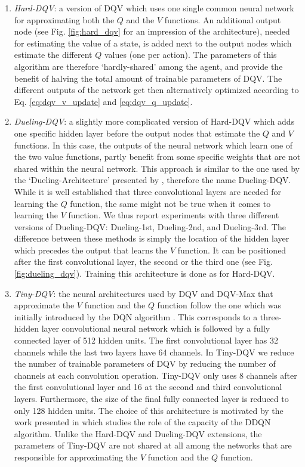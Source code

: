 \begin{enumerate}
    \item \textit{Hard-DQV}: a version of DQV which uses one single common neural network for approximating both the $Q$ and the $V$ functions. An additional output node (see Fig. \ref{fig:hard_dqv} for an impression of the architecture), needed for estimating the value of a state, is added next to the output nodes which estimate the different $Q$ values (one per action). The parameters of this algorithm are therefore `hardly-shared' among the agent, and provide the benefit of halving the total amount of trainable parameters of DQV. The different outputs of the network get then alternatively optimized according to Eq. \ref{eq:dqv_v_update} and \ref{eq:dqv_q_update}.

    \item \textit{Dueling-DQV}: a slightly more complicated version of Hard-DQV which adds one specific hidden layer before the output nodes that estimate the $Q$ and $V$ functions. In this case, the outputs of the neural network which learn one of the two value functions, partly benefit from some specific weights that are not shared within the neural network. This approach is similar to the one used by the `Dueling-Architecture' presented by \citet{wang2016dueling}, therefore the name Dueling-DQV. While it is well established that three convolutional layers are needed \cite{mnih2015human, van2016deep} for learning the $Q$ function, the same might not be true when it comes to learning the $V$ function. We thus report experiments with three different versions of Dueling-DQV: Dueling-1st, Dueling-2nd, and Dueling-3rd. The difference between these methods is simply the location of the hidden layer which precedes the output that learns the $V$ function. It can be positioned after the first convolutional layer, the second or the third one (see Fig. \ref{fig:dueling_dqv}). Training this architecture is done as for Hard-DQV.

    \item \textit{Tiny-DQV}: the neural architectures used by DQV and DQV-Max that approximate the $V$ function and the $Q$ function follow the one which was initially introduced by the DQN algorithm \cite{mnih2015human}. This corresponds to a three-hidden layer convolutional neural network which is followed by a fully connected layer of 512 hidden units. The first convolutional layer has 32 channels while the last two layers have 64 channels. In Tiny-DQV we reduce the number of trainable parameters of DQV by reducing the number of channels at each convolution operation. Tiny-DQV only uses 8 channels after the first convolutional layer and 16 at the second and third convolutional layers. Furthermore, the size of the final fully connected layer is reduced to only 128 hidden units. The choice of this architecture is motivated by the work presented in \cite{van2018deep_triad} which studies the role of the capacity of the DDQN algorithm. Unlike the Hard-DQV and Dueling-DQV extensions, the parameters of Tiny-DQV are not shared at all among the networks that are responsible for approximating the $V$ function and the $Q$ function.
\end{enumerate}

